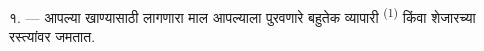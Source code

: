 %
%
%
%
%
%
%

\VUsaut{4.0mm}
\VUsaut{3.0mm}

\VUsaut{3.0mm}

१. --- आपल्या खाण्यासाठी लागणारा माल आपल्याला पुरवणारे बहुतेक व्यापारी
  \textsuperscript{(1)} किंवा शेजारच्या रस्त्यांवर
जमतात.

